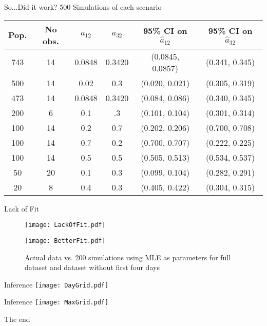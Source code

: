 \documentclass[10pt,table]{beamer}
\begin{document}
\begin{frame}{So...Did it work?}
500 Simulations of each scenario
\begin{table}
\centering
\setlength{\tabcolsep}{5pt}

\begin{tabular}{|c|c|c|c|c|c|}
\hline
Pop. & No obs. & $a_{12}$ & $a_{32}$ & 95\% CI on $\hat{a}_{12}$ & 95\% CI on $\hat{a}_{32}$  \\ \hline 
743 & 14 & 0.0848 & 0.3420 &\cellcolor{green!25}(0.0845, 0.0857) & \cellcolor{green!25}(0.341, 0.345) \\ \hline
500 & 14 & 0.02 &0.3 & \cellcolor{red!25} (0.020, 0.021) &\cellcolor{red!25}  (0.305, 0.319)\\ \hline
473 & 14 & 0.0848 & 0.3420 &\cellcolor{green!25} (0.084, 0.086) & \cellcolor{green!25}(0.340, 0.345) \\ \hline
200 & 6 & 0.1 &.3 &\cellcolor{red!25} (0.101, 0.104)&\cellcolor{red!25}  (0.301, 0.314)\\ \hline 
100 & 14 & 0.2 & 0.7 &\cellcolor{red!25} (0.202, 0.206) & \cellcolor{green!25}(0.700, 0.708) \\ \hline
100 & 14 & 0.7 & 0.2 &\cellcolor{green!25}(0.700, 0.707) & \cellcolor{red!25} (0.222, 0.225)\\ \hline
100 & 14 &0.5 &0.5 &\cellcolor{red!25} (0.505, 0.513) &\cellcolor{red!25} (0.534, 0.537)\\ \hline

50 & 20 & 0.1 &0.3 &\cellcolor{green!25}(0.099, 0.104) & \cellcolor{red!25} (0.282, 0.291)\\ \hline

20 & 8 & 0.4 & 0.3 & \cellcolor{red!25} (0.405, 0.422) & \cellcolor{red!25} (0.304, 0.315)\\ \hline



\end{tabular}
\label{tab1}
\end{table}

\end{frame}

\begin{frame}{Lack of Fit}
\begin{figure}
\centering
\begin{minipage}{.4\textwidth}
\texttt{[image: LackOfFit.pdf]}
\end{minipage}%
\begin{minipage}{.4\textwidth}

\centering
\texttt{[image: BetterFit.pdf]}
\end{minipage}
\caption{Actual data vs. 200 simulations using MLE as parameters for full dataset and dataset without first four days}
\label{plot1}
\end{figure}

\end{frame}

\begin{frame}{Inference}
\centering
\texttt{[image: DayGrid.pdf]}
\end{frame}

\begin{frame}{Inference}
\centering
\texttt{[image: MaxGrid.pdf]}
\end{frame}
\begin{frame}{}
The end
\end{frame}
\end{document}
